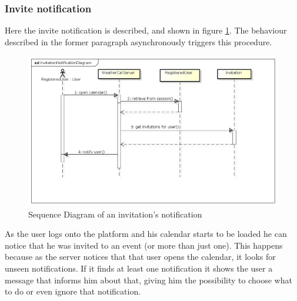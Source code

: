 \subsubsection{Invite notification}
Here the invite notification is described, and shown in figure \ref{fig:notseqdiagr}. The behaviour described in the former paragraph asynchronously triggers this procedure.
\begin{center}
 \begin{figure}[H]
    \includegraphics[width=1\textwidth,height=1\textwidth]{../UMLDiagram/sequence/InvitationNotificationDiagram/InvitationNotificationDiagram.png}
    \caption{Sequence Diagram of an invitation's notification}
     \label{fig:notseqdiagr}
     \end{figure}
   \end{center}  
As the user logs onto the platform and his calendar starts to be loaded he can notice that he was invited to an event (or more than just one). This happens because as the server notices that that user opens the calendar, it looks for unseen notifications. If it finds at least one notification it shows the user a message that informs him about that, giving him the possibility to choose what to do or even ignore that notification. 
